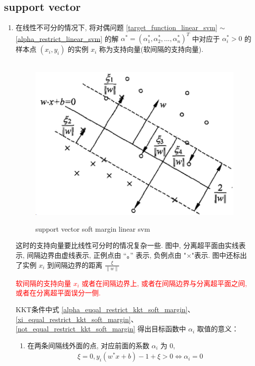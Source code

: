 \documentclass[oneside, 12pt]{ctexbook}
\begin{document}
			\subsection{\quad support vector}
				\begin{enumerate}
					\item 在线性不可分的情况下, 将对偶问题 \ref{target_function_linear_svm} $\sim$ \ref{alpha_restrict_linear_svm} 的解 $\alpha^* = (\alpha_1^*,\alpha_2^*,...,\alpha_n^*)^T$ 中对应于 $\alpha_i^* > 0$ 的样本点 $(x_i, y_i)$ 的实例 $x_i$ 称为支持向量(软间隔的支持向量). 
						\begin{figure}[H]
							\label{support_vector_soft_margin_linear_svm}
							\vspace{-0.2cm}  %
							\setlength{\abovecaptionskip}{-0.2cm}   %
							\centering
							\includegraphics[scale=0.6]{support_vector_soft_margin_linear_svm.png}
							\renewcommand{\figurename}{Fig} %
							\caption{support vector soft margin linear svm}
						\end{figure}
						这时的支持向量要比线性可分时的情况复杂一些. 图中, 分离超平面由实线表示, 间隔边界由虚线表示, 正例点由 “。” 表示, 负例点由 "$\times$"表示. 图中还标出了实例 $x_i$ 到间隔边界的距离 $\frac{\xi}{\parallel w \parallel}$
						
						\textcolor{red}{软间隔的支持向量 $x_i$  或者在间隔边界上, 或者在间隔边界与分离超平面之间, 或者在分离超平面误分一侧.}
						
						KKT条件中式 \ref{alpha_euqal_restrict_kkt_soft_margin}、 \ref{xi_equal_restrict_kkt_soft_margin}、 \ref{not_equal_restrict_kkt_soft_margin} 得出目标函数中 $\alpha_i$ 取值的意义：
						\begin{enumerate}
							\item 在两条间隔线外面的点, 对应前面的系数 $\alpha_i$ 为 0, 
								\begin{align}
									\xi = 0, y_i(w^* x + b) -1 + \xi > 0 \Leftrightarrow  \alpha_i = 0 
								\end{align}
								

\end{enumerate}
\end{enumerate}
\end{document}

